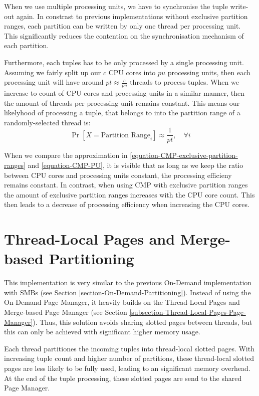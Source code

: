 When we use multiple processing units, we have to synchronise the tuple write-out again.
In constrast to previous implementations without exclusive partition ranges, each partition can be written by only one thread per processing unit.
This significantly reduces the contention on the synchronisation mechanism of each partition.

Furthermore, each tuples has to be only processed by a single processing unit.
Assuming we fairly split up our $c$ \ac{CPU} cores into $pu$ processing units, then each processing unit will have around $pt\approx\frac{c}{pu}$ threads to process tuples.
When we increase to count of CPU cores and processing units in a similar manner, then the amount of threads per processing unit remains constant.
This means our likelyhood of processing a tuple, that belongs to into the partition range of a randomly-selected thread is:
\begin{equation}\label{equation-CMP-PU}
  \Pr[X=\textrm{Partition Range}_i] \approx \frac{1}{pt},  \quad \forall i
\end{equation}

When we compare the approximation in \ref{equation-CMP-exclusive-partition-ranges} and \ref{equation-CMP-PU}, it is visible that as long as we keep the ratio between CPU cores and processing units constant, the processing efficieny remains constant.
In contrast, when using \acl{CMP} with exclusive partition ranges the amount of exclusive partition ranges increases with the CPU core count.
This then leads to a decrease of processing efficiency when increasing the CPU cores.

\section{Thread-Local Pages and Merge-based Partitioning}
This implementation is very similar to the previous On-Demand implementation with \aclp{SMB} (see Section \ref{section-On-Demand-Partitioning}).
Instead of using the On-Demand Page Manager, it heavily builds on the Thread-Local Pages and Merge-based Page Manager (see Section \ref{subsection-Thread-Local-Pages-Page-Manager}).
Thus, this solution avoids sharing slotted pages between threads, but this can only be achieved with significant higher memory usage.

Each thread partitiones the incoming tuples into thread-local slotted pages.
With increasing tuple count and higher number of partitions, these thread-local slotted pages are less likely to be fully used, leading to an significant memory overhead.
At the end of the tuple processing, these slotted pages are send to the shared Page Manager.

